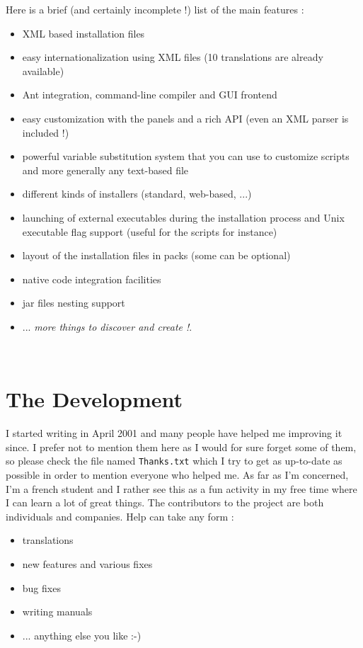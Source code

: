 Here is a brief (and certainly incomplete !) list of the main \IzPack features :
\begin{itemize}
  \item XML based installation files
  \item easy internationalization using XML files (10 translations are already
  available)
  \item Ant integration, command-line compiler and GUI frontend
  \item easy customization with the panels and a rich API (even an XML parser is
  included !)
  \item powerful variable substitution system that you can use to customize
  scripts and more generally any text-based file
  \item different kinds of installers (standard, web-based, ...)
  \item launching of external executables during the installation process and Unix
  executable flag support (useful for the scripts for instance)
  \item layout of the installation files in packs (some can be optional)
  \item native code integration facilities
  \item jar files nesting support
  \item ... \textsl{more things to discover and create !}.
\end{itemize}\

\section*{The Development}

I started writing \IzPack in April 2001 and many people have helped me
improving it since. I prefer not to mention them here as I would for sure forget
some of them, so please check the file named \texttt{Thanks.txt} which I try to
get as up-to-date as possible in order to mention everyone who helped me. As far
as I'm concerned, I'm a french student and I rather see this as a fun activity
in my free time where I can learn a lot of great things. The contributors to the
project are both individuals and companies. Help can take any form :
\begin{itemize}
  \item translations
  \item new features and various fixes
  \item bug fixes
  \item writing manuals
  \item ... anything else you like :-)
\end{itemize}\

